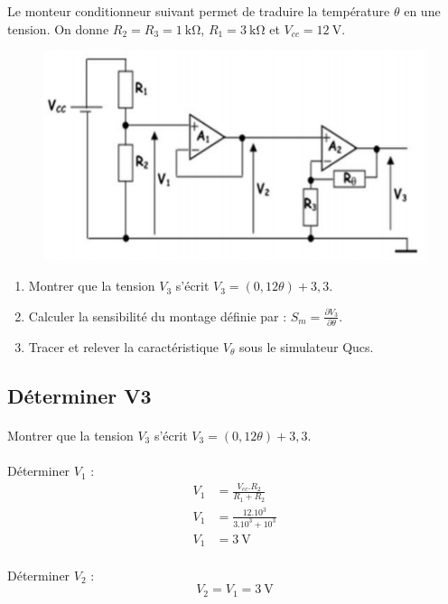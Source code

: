 \documentclass{article}
\begin{document}
Le monteur conditionneur suivant permet de traduire la température $\theta$ en une tension. On donne $R_2 = R_3 = \SI{1}{\kilo\ohm}$, $R_1 = \SI{3}{\kilo\ohm}$ et $V_{cc} = \SI{12}{\volt}$.

\begin{figure}[H]
    \centering
    \includegraphics[width=0.6\linewidth]{./images/003-ex-sensibilite.png}
\end{figure}

\begin{enumerate}
    \item Montrer que la tension $V_3$ s'écrit $V_3 = (0,12\theta) + 3,3$.
    \item Calculer la sensibilité du montage définie par : $S_m = \frac{\partial V_3}{\partial\theta}$.
    \item Tracer et relever la caractéristique $V_\theta$ sous le simulateur Qucs.
\end{enumerate}

\subsection{Déterminer V3}
\paragraph{}
Montrer que la tension $V_3$ s'écrit $V_3 = (0,12\theta) + 3,3$.

\paragraph{}
Déterminer $V_1$ :
\begin{align*}
    V_1 & = \frac{V_{cc} . R_2}{R_1 + R_2}  \\
    V_1 & = \frac{12 . 10^3}{3.10^3 + 10^3} \\
    V_1 & = \SI{3}{\volt}
\end{align*}

\paragraph{}
Déterminer $V_2$ :
\begin{equation*}
    V_2 = V_1 = \SI{3}{\volt}
\end{equation*}
\end{document}

